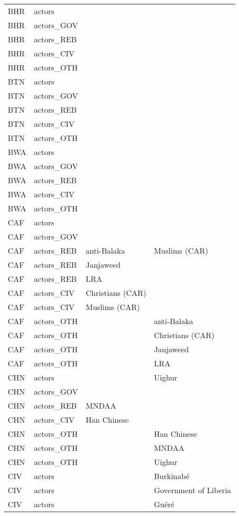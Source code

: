 \begin{table}[ht]
\begin{tabular}{llll}
  BHR & actors &  &  \\ 
  BHR & actors\_GOV &  &  \\ 
  BHR & actors\_REB &  &  \\ 
  BHR & actors\_CIV &  &  \\ 
  BHR & actors\_OTH &  &  \\ 
  BTN & actors &  &  \\ 
  BTN & actors\_GOV &  &  \\ 
  BTN & actors\_REB &  &  \\ 
  BTN & actors\_CIV &  &  \\ 
  BTN & actors\_OTH &  &  \\ 
  BWA & actors &  &  \\ 
  BWA & actors\_GOV &  &  \\ 
  BWA & actors\_REB &  &  \\ 
  BWA & actors\_CIV &  &  \\ 
  BWA & actors\_OTH &  &  \\ 
  CAF & actors &  &  \\ 
  CAF & actors\_GOV &  &  \\ 
  CAF & actors\_REB & anti-Balaka & Muslims (CAR) \\ 
  CAF & actors\_REB & Janjaweed &  \\ 
  CAF & actors\_REB & LRA &  \\ 
  CAF & actors\_CIV & Christians (CAR) &  \\ 
  CAF & actors\_CIV & Muslims (CAR) &  \\ 
  CAF & actors\_OTH &  & anti-Balaka \\ 
  CAF & actors\_OTH &  & Christians (CAR) \\ 
  CAF & actors\_OTH &  & Janjaweed \\ 
  CAF & actors\_OTH &  & LRA \\ 
  CHN & actors &  & Uighur \\ 
  CHN & actors\_GOV &  &  \\ 
  CHN & actors\_REB & MNDAA &  \\ 
  CHN & actors\_CIV & Han Chinese &  \\ 
  CHN & actors\_OTH &  & Han Chinese \\ 
  CHN & actors\_OTH &  & MNDAA \\ 
  CHN & actors\_OTH &  & Uighur \\ 
  CIV & actors &  & Burkinabé \\ 
  CIV & actors &  & Government of Liberia \\ 
  CIV & actors &  & Guéré \\ 

\end{tabular}
\end{table}
